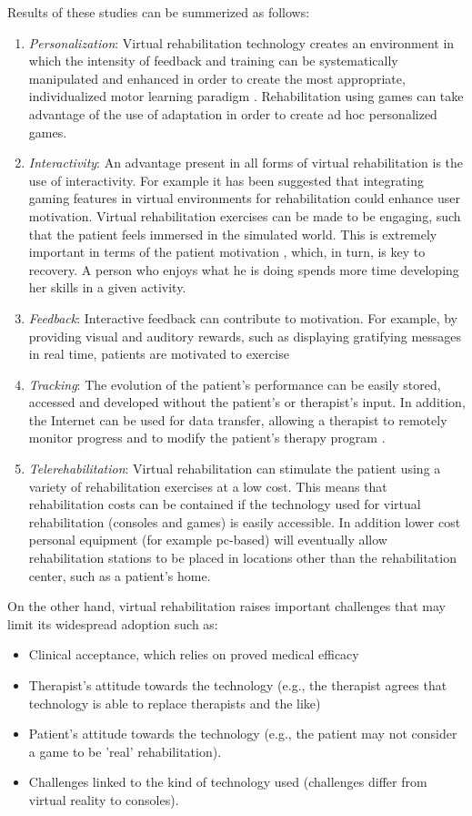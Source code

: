 \documentclass[preprint,authoryear,12pt]{elsarticle}
\begin{document}
Results of these studies can be summerized as follows: 
\begin{enumerate}
  \item	\emph{Personalization}: Virtual rehabilitation technology creates an environment in which the intensity of feedback and training can be systematically manipulated and enhanced in order to create the most appropriate, individualized motor learning paradigm  \citep{burdea}. Rehabilitation using games can take advantage of the use of adaptation in order to create ad hoc personalized games.
  \item \emph{Interactivity}: An advantage present in all forms of virtual rehabilitation is the use of interactivity. For example it has been suggested that integrating gaming features in virtual environments for rehabilitation could enhance user motivation. Virtual rehabilitation exercises can be made to be engaging, such that the patient feels immersed in the simulated world. This is extremely important in terms of the patient motivation \citep{Popescu}, which, in turn, is key to recovery.  A person who enjoys what he is doing spends more time developing her skills in a given activity.
  \item	\emph{Feedback}: Interactive feedback can contribute to motivation. For example, by providing visual and auditory rewards, such as displaying gratifying messages in real time, patients are motivated to exercise \citep{Chen2006b,Goude2007a}
  \item	\emph{Tracking}: The evolution of the patient's performance can be easily stored, accessed and developed without the patient's or therapist's input. In addition, the Internet can be used for data transfer, allowing a therapist to remotely monitor progress and to modify the patient's therapy program \citep{burdea, Popescu}. 
  \item \emph{Telerehabilitation}: Virtual rehabilitation can stimulate the patient using a variety of rehabilitation exercises at a low cost. This means that rehabilitation costs can be contained if the technology used for virtual rehabilitation (consoles and games) is easily accessible.  In addition lower cost personal equipment (for example pc-based) will eventually allow rehabilitation stations to be placed in locations other than the rehabilitation center, such as a patient's home.
 \end{enumerate}

On the other hand, virtual rehabilitation raises important challenges that may limit its widespread adoption such as:
\begin{itemize}
  \item	Clinical acceptance, which relies on proved medical efficacy
  \item	Therapist's attitude towards the technology (e.g., the therapist agrees that  technology  is able to replace therapists and the like)
  \item	Patient's attitude towards the technology (e.g., the patient may not consider a game to be 'real' rehabilitation).
  \item	Challenges linked to the kind of technology used (challenges differ from virtual reality to consoles). 
 \end{itemize}
\end{document}
